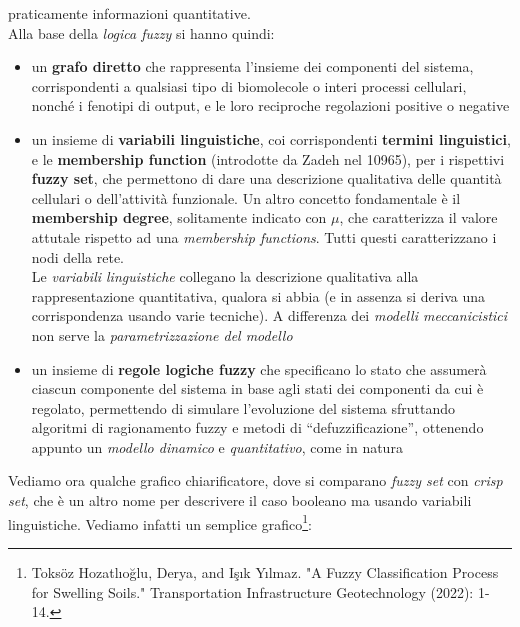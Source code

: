 \documentclass[a4paper,12pt, oneside]{book}
\begin{document}
praticamente informazioni quantitative.\\
Alla base della \textit{logica fuzzy} si hanno quindi:
\begin{itemize}
  \item un \textbf{grafo diretto} che rappresenta l'insieme dei componenti del
  sistema, corrispondenti a qualsiasi tipo di biomolecole o interi processi
  cellulari, nonché i fenotipi di output, e le loro reciproche regolazioni
  positive o negative  
  \item un insieme di \textbf{variabili linguistiche}, coi corrispondenti
  \textbf{termini linguistici}, e le \textbf{membership function} (introdotte da
  Zadeh nel 10965), per i
  rispettivi \textbf{fuzzy set}, che permettono di dare una descrizione
  qualitativa delle quantità cellulari o dell'attività funzionale. Un altro
  concetto fondamentale è il \textbf{membership degree}, solitamente indicato
  con $\mu$, che caratterizza il valore attutale rispetto ad una
  \textit{membership functions}. Tutti questi caratterizzano i nodi della
  rete.\\ 
  Le \textit{variabili linguistiche} collegano la descrizione qualitativa alla
  rappresentazione quantitativa, qualora si abbia (e in assenza si deriva una
  corrispondenza usando varie tecniche). A differenza dei \textit{modelli
    meccanicistici} non serve la \textit{parametrizzazione del modello}
  \item un insieme di \textbf{regole logiche fuzzy} che specificano lo stato che
  assumerà ciascun componente del sistema in base agli stati dei componenti da
  cui è regolato, permettendo di simulare l'evoluzione del sistema sfruttando
  algoritmi di ragionamento fuzzy e metodi di ``defuzzificazione'', ottenendo
  appunto un \textit{modello dinamico} e \textit{quantitativo}, come in natura
\end{itemize}
\newpage
\noindent
Vediamo ora qualche grafico chiarificatore, dove si comparano \textit{fuzzy set}
con \textit{crisp set}, che è un altro nome per descrivere il caso booleano ma
usando variabili linguistiche. Vediamo infatti un semplice
grafico\footnote{Toksöz Hozatlıoğlu, Derya, and Işık Yılmaz. "A Fuzzy
  Classification Process for Swelling Soils." Transportation Infrastructure
  Geotechnology (2022): 1-14.}:
\end{document}
